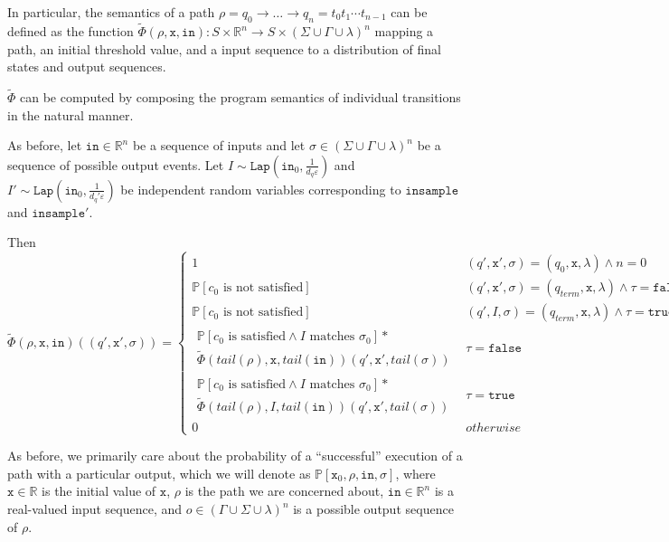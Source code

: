 \documentclass[12pt]{article}
\newcommand{\RR}{\mathbb{R}}
\newcommand{\PP}{\mathbb{P}}
\newcommand{\Lap}{\texttt{Lap}}
\theoremstyle{definition}
\begin{document}
In particular, the semantics of a path $\rho = q_0\to \ldots \to q_n = t_0t_1\cdots t_{n-1}$ can be defined as the function $\tilde{\Phi}(\rho, \texttt{x}, \texttt{in}): S\times \RR^n\to S\times (\Sigma\cup\Gamma\cup\lambda)^n$ mapping a path, an initial threshold value, and a input sequence to a distribution of final states and output sequences. 

$\tilde{\Phi}$ can be computed by composing the program semantics of individual transitions in the natural manner.

As before, let $\texttt{in}\in \RR^n$ be a sequence of inputs and let $\sigma \in (\Sigma\cup\Gamma\cup\lambda)^n$ be a sequence of possible output events.
Let $I\sim \Lap(\texttt{in}_0, \frac{1}{d_q\varepsilon})$ and $I'\sim \Lap(\texttt{in}_0, \frac{1}{d_q'\varepsilon})$ be independent random variables corresponding to $\texttt{insample}$ and $\texttt{insample}'$. 

Then \[
    \tilde{\Phi}(\rho, \texttt{x}, \texttt{in})((q', \texttt{x}', \sigma)) = \begin{cases}
        1 & (q', \texttt{x}', \sigma)=(q_0, \texttt{x}, \lambda)\land n = 0\\
        \PP[c_0\text{ is not satisfied}] & (q', \texttt{x}', \sigma) = (q_{term}, \texttt{x}, \lambda)\land \tau = \texttt{false} \\
        \PP[c_0\text{ is not satisfied}] & (q', I, \sigma) = (q_{term}, \texttt{x}, \lambda)\land \tau = \texttt{true}\\
        \begin{gathered}
            \PP[c_0\text{ is satisfied}\land I \text{ matches }\sigma_0]*\\
            \tilde{\Phi}(tail(\rho),\texttt{x}, tail(\texttt{in}))(q', \texttt{x}', tail(\sigma))
        \end{gathered} & \tau = \texttt{false}\\
        \begin{gathered}
            \PP[c_0\text{ is satisfied}\land I \text{ matches }\sigma_0]*\\
            \tilde{\Phi}(tail(\rho),I, tail(\texttt{in}))(q', \texttt{x}', tail(\sigma))
        \end{gathered} & \tau = \texttt{true}\\
        0 & otherwise
    \end{cases}
\]

As before, we primarily care about the probability of a ``successful'' execution of a path with a particular output, which we will denote as $\PP[\texttt{x}_0, \rho, \texttt{in}, \sigma]$, where $\texttt{x} \in \RR$ is the initial value of $\texttt{x}$, $\rho$ is the path we are concerned about, $\texttt{in}\in \RR^n$ is a real-valued input sequence, and $o\in (\Gamma\cup\Sigma\cup\lambda)^n$ is a possible output sequence of $\rho$. 
\end{document}
